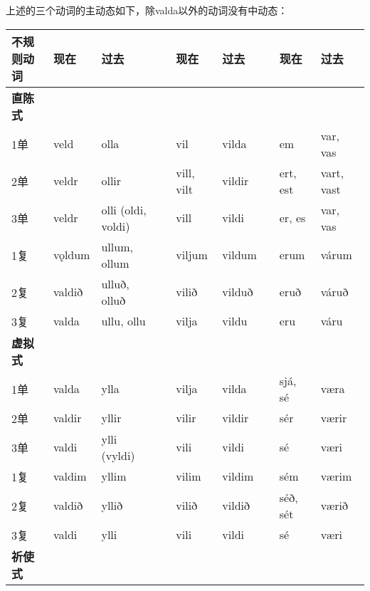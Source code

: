 上述的三个动词的主动态如下，除valda以外的动词没有中动态：

\begin{longtable}{lllllllll}
    \toprule
    不规则动词      & 现在     & 过去               &  & 现在       & 过去   &  & 现在     & 过去       \\
    \midrule
    \endhead
    \bottomrule
    \endfoot
    \textbf{直陈式} &          &                    &  &            &        &  &          &            \\
    1单             & veld     & olla               &  & vil        & vilda  &  & em       & var, vas   \\
    2单             & veldr    & ollir              &  & vill, vilt & vildir &  & ert, est & vart, vast \\
    3单             & veldr    & olli (oldi, voldi) &  & vill       & vildi  &  & er, es   & var,
    vas                                                                                                 \\
    1复             & vǫldum   & ullum, ollum       &  & viljum     & vildum &  & erum     & várum      \\
    2复             & valdið   & ulluð, olluð       &  & vilið      & vilduð &  & eruð     & váruð      \\
    3复             & valda    & ullu, ollu         &  & vilja      & vildu  &  & eru      & váru       \\
    \textbf{虚拟式} &          &                    &  &            &        &  &          &            \\
    1单             & valda    & ylla               &  & vilja      & vilda  &  & sjá, sé  & væra       \\
    2单             & valdir   & yllir              &  & vilir      & vildir &  & sér      & værir      \\
    3单             & valdi    & ylli (vyldi)       &  & vili       & vildi  &  & sé       & væri       \\
    1复             & valdim   & yllim              &  & vilim      & vildim &  & sém      & værim      \\
    2复             & valdið   & yllið              &  & vilið      & vildið &  & séð, sét & værið      \\
    3复             & valdi    & ylli               &  & vili       & vildi  &  & sé       & væri       \\
    \textbf{祈使式} &          &                    &  &            &        &  &          &            \\

\end{longtable}

